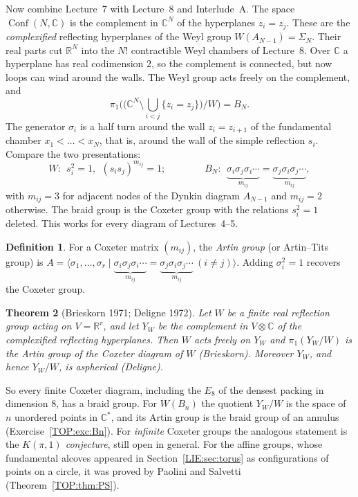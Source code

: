 \documentclass[11pt,openany]{book}
\theoremstyle{plain}
\newtheorem{theorem}{Theorem}[chapter]
\theoremstyle{definition}
\newtheorem{definition}[theorem]{Definition}
\theoremstyle{remark}
\newcommand{\R}{\mathbb{R}}
\newcommand{\C}{\mathbb{C}}
\newcommand{\Conf}{\operatorname{Conf}}
\begin{document}
Now combine Lecture~7 with Lecture~8 and Interlude~A. The space $\Conf(N,\C)$ is the complement in $\C^N$ of the
hyperplanes $z_i=z_j$. These are the \emph{complexified} reflecting hyperplanes of the Weyl group
$W(A_{N-1})=\Sigma_N$. Their real parts cut $\R^N$ into the $N!$ contractible Weyl chambers of Lecture~8. Over $\C$
a hyperplane has real codimension $2$, so the complement is connected, but now loops can wind around the
walls. The Weyl group acts freely on the complement, and
\[
  \pi_1\Big(\big(\C^N\setminus\textstyle\bigcup_{i<j}\{z_i=z_j\}\big)\big/W\Big)=B_N .
\]
The generator $\sigma_i$ is a half turn around the wall $z_i=z_{i+1}$ of the fundamental chamber
$x_1<\dots<x_N$, that is, around the wall of the simple reflection $s_i$. Compare the two presentations:
\[
  W:\ \ s_i^2=1,\ \ (s_is_j)^{m_{ij}}=1;\qquad\qquad
  B_N:\ \ \underbrace{\sigma_i\sigma_j\sigma_i\cdots}_{m_{ij}}=\underbrace{\sigma_j\sigma_i\sigma_j\cdots}_{m_{ij}},
\]
with $m_{ij}=3$ for adjacent nodes of the Dynkin diagram $A_{N-1}$ and $m_{ij}=2$ otherwise. The braid
group is the Coxeter group with the relations $s_i^2=1$ deleted. This works for every diagram of
Lectures~4--5.

\begin{definition}
For a Coxeter matrix $(m_{ij})$, the \emph{Artin group} (or Artin--Tits group) is
$A=\langle\sigma_1,\dots,\sigma_r\mid\underbrace{\sigma_i\sigma_j\sigma_i\cdots}_{m_{ij}}=
\underbrace{\sigma_j\sigma_i\sigma_j\cdots}_{m_{ij}}\ (i\neq j)\rangle$. Adding $\sigma_i^2=1$ recovers the
Coxeter group.
\end{definition}

\begin{theorem}[Brieskorn 1971; Deligne 1972]\label{TOP:thm:BD}
Let $W$ be a finite real reflection group acting on $V=\R^r$, and let $Y_W$ be the complement in $V\otimes\C$
of the complexified reflecting hyperplanes. Then $W$ acts freely on $Y_W$ and $\pi_1(Y_W/W)$ is the Artin
group of the Coxeter diagram of $W$ (Brieskorn). Moreover $Y_W$, and hence $Y_W/W$, is aspherical (Deligne).
\end{theorem}

So every finite Coxeter diagram, including the $E_8$ of the densest packing in dimension $8$, has a braid group. For
$W(B_n)$ the quotient $Y_W/W$ is the space of $n$ unordered points in $\C^*$, and its Artin group is the braid
group of an annulus (Exercise~\ref{TOP:exc:Bn}). For \emph{infinite} Coxeter groups the analogous statement
is the \emph{$K(\pi,1)$ conjecture}, still open in general. For the affine groups, whose fundamental
alcoves appeared in Section~\ref{LIE:sec:torus} as configurations of points on a circle, it was proved by
Paolini and Salvetti (Theorem~\ref{TOP:thm:PS}).
\end{document}
